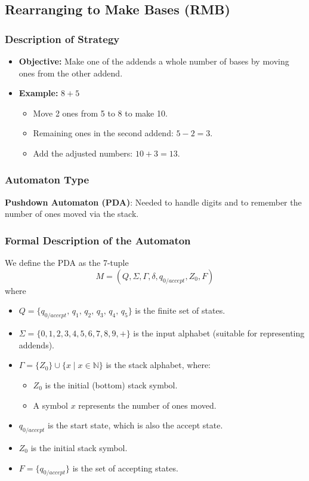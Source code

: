 \documentclass[11pt]{article}
\begin{document}
\subsection*{Rearranging to Make Bases (RMB)}

\subsubsection*{Description of Strategy}
\begin{itemize}
    \item \textbf{Objective:} Make one of the addends a whole number of bases by moving ones from the other addend.
    \item \textbf{Example:} \(8 + 5\)
    \begin{itemize}
        \item Move 2 ones from 5 to 8 to make 10.
        \item Remaining ones in the second addend: \(5 - 2 = 3\).
        \item Add the adjusted numbers: \(10 + 3 = 13\).
    \end{itemize}
\end{itemize}

\subsubsection*{Automaton Type}
\textbf{Pushdown Automaton (PDA)}: Needed to handle digits and to remember the number of ones moved via the stack.

\subsubsection*{Formal Description of the Automaton}

We define the PDA as the 7-tuple
\[
M = (Q,\Sigma,\Gamma,\delta,q_{0/accept},Z_0,F)
\]
where
\begin{itemize}
    \item \(Q = \{q_{0/accept},\, q_1,\, q_2,\, q_3,\, q_4,\, q_5\}\) is the finite set of states.
    \item \(\Sigma = \{0,1,2,3,4,5,6,7,8,9,+\}\) is the input alphabet (suitable for representing addends).
    \item \(\Gamma = \{Z_0\} \cup \{x \mid x \in \mathbb{N}\}\) is the stack alphabet, where:
        \begin{itemize}
            \item \(Z_0\) is the initial (bottom) stack symbol.
            \item A symbol \(x\) represents the number of ones moved.
        \end{itemize}
    \item \(q_{0/accept}\) is the start state, which is also the accept state.
    \item \(Z_0\) is the initial stack symbol.
    \item \(F = \{q_{0/accept}\}\) is the set of accepting states.
\end{itemize}
\end{document}
